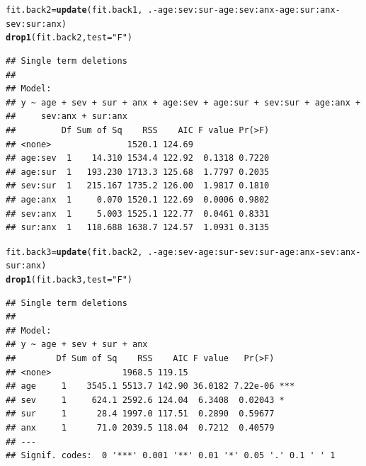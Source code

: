 \documentclass{article}\usepackage[]{graphicx}\usepackage[]{color}
\makeatletter
\newcommand{\hlstr}[1]{\textcolor[rgb]{0.192,0.494,0.8}{#1}}%
\newcommand{\hlopt}[1]{\textcolor[rgb]{0,0,0}{#1}}%
\newcommand{\hlstd}[1]{\textcolor[rgb]{0.345,0.345,0.345}{#1}}%
\newcommand{\hlkwb}[1]{\textcolor[rgb]{0.69,0.353,0.396}{#1}}%
\newcommand{\hlkwc}[1]{\textcolor[rgb]{0.333,0.667,0.333}{#1}}%
\newcommand{\hlkwd}[1]{\textcolor[rgb]{0.737,0.353,0.396}{\textbf{#1}}}%
\newenvironment{kframe}{%
 \def\at@end@of@kframe{}%
 \ifinner\ifhmode%
  \def\at@end@of@kframe{\end{minipage}}%
  \begin{minipage}{\columnwidth}%
 \fi\fi%
 \def\FrameCommand##1{\hskip\@totalleftmargin \hskip-\fboxsep
 \colorbox{shadecolor}{##1}\hskip-\fboxsep
     \hskip-\linewidth \hskip-\@totalleftmargin \hskip\columnwidth}%
 \MakeFramed {\advance\hsize-\width
   \@totalleftmargin\z@ \linewidth\hsize
   \@setminipage}}%
 {\par\unskip\endMakeFramed%
 \at@end@of@kframe}
\newenvironment{knitrout}{}{} %
\makeatother
\begin{document}
\clearpage
\begin{knitrout}
\color{fgcolor}\begin{kframe}
\begin{alltt}
\hlstd{fit.back2} \hlkwb{=} \hlkwd{update}\hlstd{(fit.back1,} \hlopt{~}\hlstd{.} \hlopt{-} \hlstd{age}\hlopt{:}\hlstd{sev}\hlopt{:}\hlstd{sur} \hlopt{-} \hlstd{age}\hlopt{:}\hlstd{sev}\hlopt{:}\hlstd{anx} \hlopt{-} \hlstd{age}\hlopt{:}\hlstd{sur}\hlopt{:}\hlstd{anx} \hlopt{-}
    \hlstd{sev}\hlopt{:}\hlstd{sur}\hlopt{:}\hlstd{anx)}
\hlkwd{drop1}\hlstd{(fit.back2,} \hlkwc{test} \hlstd{=} \hlstr{"F"}\hlstd{)}
\end{alltt}
\begin{verbatim}
## Single term deletions
## 
## Model:
## y ~ age + sev + sur + anx + age:sev + age:sur + sev:sur + age:anx + 
##     sev:anx + sur:anx
##         Df Sum of Sq    RSS    AIC F value Pr(>F)
## <none>               1520.1 124.69               
## age:sev  1    14.310 1534.4 122.92  0.1318 0.7220
## age:sur  1   193.230 1713.3 125.68  1.7797 0.2035
## sev:sur  1   215.167 1735.2 126.00  1.9817 0.1810
## age:anx  1     0.070 1520.1 122.69  0.0006 0.9802
## sev:anx  1     5.003 1525.1 122.77  0.0461 0.8331
## sur:anx  1   118.688 1638.7 124.57  1.0931 0.3135
\end{verbatim}
\end{kframe}
\end{knitrout}
\begin{knitrout}
\color{fgcolor}\begin{kframe}
\begin{alltt}
\hlstd{fit.back3} \hlkwb{=} \hlkwd{update}\hlstd{(fit.back2,} \hlopt{~}\hlstd{.} \hlopt{-} \hlstd{age}\hlopt{:}\hlstd{sev} \hlopt{-} \hlstd{age}\hlopt{:}\hlstd{sur} \hlopt{-} \hlstd{sev}\hlopt{:}\hlstd{sur} \hlopt{-} \hlstd{age}\hlopt{:}\hlstd{anx} \hlopt{-} \hlstd{sev}\hlopt{:}\hlstd{anx} \hlopt{-}
    \hlstd{sur}\hlopt{:}\hlstd{anx)}
\hlkwd{drop1}\hlstd{(fit.back3,} \hlkwc{test} \hlstd{=} \hlstr{"F"}\hlstd{)}
\end{alltt}
\begin{verbatim}
## Single term deletions
## 
## Model:
## y ~ age + sev + sur + anx
##        Df Sum of Sq    RSS    AIC F value   Pr(>F)    
## <none>              1968.5 119.15                     
## age     1    3545.1 5513.7 142.90 36.0182 7.22e-06 ***
## sev     1     624.1 2592.6 124.04  6.3408  0.02043 *  
## sur     1      28.4 1997.0 117.51  0.2890  0.59677    
## anx     1      71.0 2039.5 118.04  0.7212  0.40579    
## ---
## Signif. codes:  0 '***' 0.001 '**' 0.01 '*' 0.05 '.' 0.1 ' ' 1
\end{verbatim}
\end{kframe}
\end{knitrout}
\end{document}
